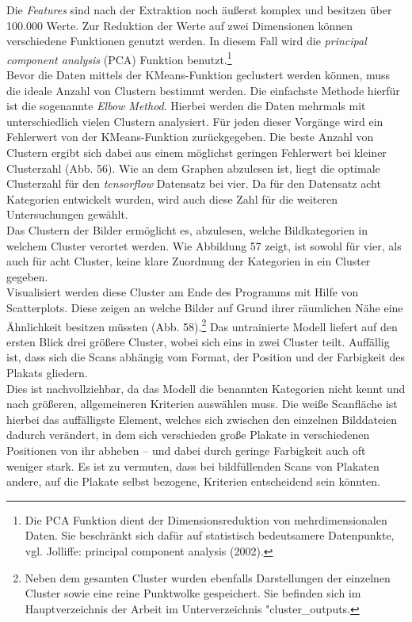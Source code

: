 \documentclass[a4paper,12pt,ngerman]{article}
\begin{document}
Die \textit{Features} sind nach der Extraktion noch äußerst komplex und besitzen über 100.000 Werte. Zur Reduktion der Werte auf zwei Dimensionen können verschiedene Funktionen genutzt werden. In diesem Fall wird die \textit{principal component analysis} (PCA) Funktion benutzt.\footnote{Die PCA Funktion dient der Dimensionsreduktion von mehrdimensionalen Daten. Sie beschränkt sich dafür auf statistisch bedeutsamere Datenpunkte, vgl. Jolliffe: principal component analysis (2002).} \\
Bevor die Daten mittels der KMeans-Funktion geclustert werden können, muss die ideale Anzahl von Clustern bestimmt werden. Die einfachste Methode hierfür ist die sogenannte \textit{Elbow Method}. Hierbei werden die Daten mehrmals mit unterschiedlich vielen Clustern analysiert. Für jeden dieser Vorgänge wird ein Fehlerwert von der KMeans-Funktion zurückgegeben. Die beste Anzahl von Clustern ergibt sich dabei aus einem möglichst geringen Fehlerwert bei kleiner Clusterzahl (Abb. 56). Wie an dem Graphen abzulesen ist, liegt die optimale Clusterzahl für den \textit{tensorflow} Datensatz bei vier. Da für den Datensatz acht Kategorien entwickelt wurden, wird auch diese Zahl für die weiteren Untersuchungen gewählt. \\
Das Clustern der Bilder ermöglicht es, abzulesen, welche Bildkategorien in welchem Cluster verortet werden. Wie Abbildung 57 zeigt, ist sowohl für vier, als auch für acht Cluster, keine klare Zuordnung der Kategorien in ein Cluster gegeben. \\
Visualisiert werden diese Cluster am Ende des Programms mit Hilfe von Scatterplots. Diese zeigen an welche Bilder auf Grund ihrer räumlichen Nähe eine Ähnlichkeit besitzen müssten (Abb. 58).\footnote{Neben dem gesamten Cluster wurden ebenfalls Darstellungen der einzelnen Cluster sowie eine reine Punktwolke gespeichert. Sie befinden sich im Hauptverzeichnis der Arbeit im Unterverzeichnis "cluster\_outputs.} Das untrainierte Modell liefert auf den ersten Blick drei größere Cluster, wobei sich eins in zwei Cluster teilt. Auffällig ist, dass sich die Scans abhängig vom Format, der Position und der Farbigkeit des Plakats gliedern. \\
Dies ist nachvollziehbar, da das Modell die benannten Kategorien nicht kennt und nach größeren, allgemeineren Kriterien auswählen muss. Die weiße Scanfläche ist hierbei das auffälligste Element, welches sich zwischen den einzelnen Bilddateien dadurch verändert, in dem sich verschieden große Plakate in verschiedenen Positionen von ihr abheben -- und dabei durch geringe Farbigkeit auch oft weniger stark. Es ist zu vermuten, dass bei bildfüllenden Scans von Plakaten andere, auf die Plakate selbst bezogene, Kriterien entscheidend sein könnten. \\
\end{document}
